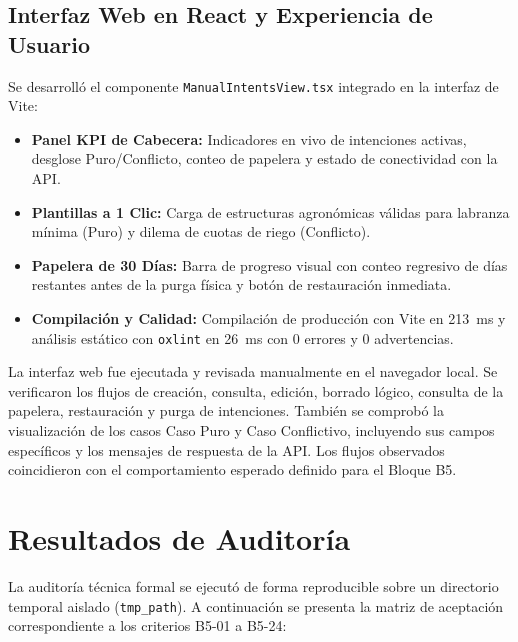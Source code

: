 \documentclass[11pt,a4paper]{article}
\begin{document}
\subsection{Interfaz Web en React y Experiencia de Usuario}
Se desarrolló el componente \texttt{ManualIntentsView.tsx} integrado en la interfaz de Vite:
\begin{itemize}[itemsep=2pt]
    \item \textbf{Panel KPI de Cabecera:} Indicadores en vivo de intenciones activas, desglose Puro/Conflicto, conteo de papelera y estado de conectividad con la API.
    \item \textbf{Plantillas a 1 Clic:} Carga de estructuras agronómicas válidas para labranza mínima (Puro) y dilema de cuotas de riego (Conflicto).
    \item \textbf{Papelera de 30 Días:} Barra de progreso visual con conteo regresivo de días restantes antes de la purga física y botón de restauración inmediata.
    \item \textbf{Compilación y Calidad:} Compilación de producción con Vite en 213~ms y análisis estático con \texttt{oxlint} en 26~ms con 0 errores y 0 advertencias.
\end{itemize}

La interfaz web fue ejecutada y revisada manualmente en el navegador local. Se verificaron los flujos de creación, consulta, edición, borrado lógico, consulta de la papelera, restauración y purga de intenciones. También se comprobó la visualización de los casos Caso Puro y Caso Conflictivo, incluyendo sus campos específicos y los mensajes de respuesta de la API. Los flujos observados coincidieron con el comportamiento esperado definido para el Bloque B5.

\section{Resultados de Auditoría}

La auditoría técnica formal se ejecutó de forma reproducible sobre un directorio temporal aislado (\texttt{tmp\_path}). A continuación se presenta la matriz de aceptación correspondiente a los criterios B5-01 a B5-24:
\end{document}

